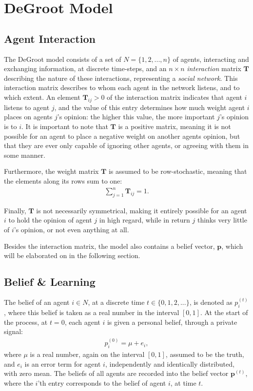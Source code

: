 \documentclass[a4paper, 12pt]{report}
\newcommand{\T}{\bm{T}}
\newcommand{\Tij}{\T_{ij}}
\newcommand{\beli}[3][2]{p_{#2}^{(#3)}}
\begin{document}
\section{DeGroot Model}
\subsection{Agent Interaction}
\label{interaction:matrix}
The DeGroot model \parencite{degroot1974concensus} consists of a set of $N=\{1, 2, ..., n\}$ of agents, interacting and exchanging information, at discrete time-steps, and an $n \times n$ \emph{interaction} matrix $\T$ describing the nature of these interactions, representing a \emph{social network}. This interaction matrix describes to whom each agent in the network listens, and to which extent. An element $\Tij > 0$ of the interaction matrix indicates that agent $i$ listens to agent $j$, and the value of this entry determines how much weight agent $i$ places on agents $j$'s opinion: the higher this value, the more important $j$'s opinion is to $i$. It is important to note that $\T$ is a positive matrix, meaning it is not possible for an agent to place a negative weight on another agents opinion, but that they are ever only capable of ignoring other agents, or agreeing with them in some manner. 

\newpage

\noindent Furthermore, the weight matrix $\T$ is assumed to be row-stochastic, meaning that the elements along its rows sum to one:
\begin{align*}
    \sum_{j=1}^{n} \Tij = 1.
\end{align*}

\noindent Finally, $\T$ is not necessarily symmetrical, making it entirely possible for an agent $i$ to hold the opinion of agent $j$ in high regard, while in return $j$ thinks very little of $i$'s opinion, or not even anything  at all.

\noindent Besides the interaction matrix, the model also contains a belief vector, $\bm{p}$, which will be elaborated on in the following section.

\subsection{Belief \& Learning}
\label{beliefs}

The belief of an agent $i \in N$, at a discrete time $t \in \{0, 1, 2, ...\}$, is denoted as $p_{i}^{(t)}$, where this belief is taken as a real number in the interval $[0, 1]$. At the start of the process, at $t=0$, each agent $i$ is given a personal belief, through a private signal:
\begin{align*}
    \beli{i}{0} = \mu + e_i,
\end{align*}
where $\mu$ is a real number, again on the interval $[0, 1]$, assumed to be the truth, and $e_i$ is an error term for agent $i$, independently and identically distributed, with zero mean.
The beliefs of all agents are recorded into the belief vector $\bm{p}^{(t)}$, where the $i$'th entry corresponds to the belief of agent $i$, at time $t$.
\end{document}
